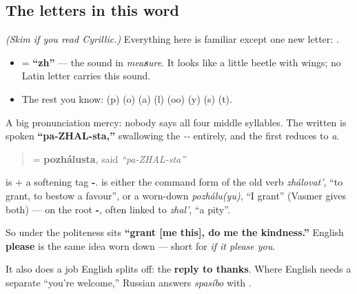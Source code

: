 \subsection*{The letters in this word}
\emph{(Skim if you read Cyrillic.)} Everything here is familiar except one new letter: \textbf{}.

\begin{itemize}
\raggedright
  \item \textbf{} = \textbf{\textquotedblleft{}zh\textquotedblright{}} — the sound in \emph{mea\textbf{s}ure}. It looks like a little beetle with wings; no Latin letter carries this sound.
  \item The rest you know: \textbf{}(p) \textbf{}(o) \textbf{}(a) \textbf{}(l) \textbf{}(oo) \textbf{}(y) \textbf{}(s) \textbf{}(t).
\end{itemize}

A big pronunciation mercy: nobody says all four middle syllables. The written \emph{} is spoken \textbf{\textquotedblleft{}pa-ZHAL-sta,\textquotedblright{}} swallowing the \emph{--} entirely, and the first \emph{} reduces to \emph{a}.

\begin{quote}
\textbf{} = \textbf{pozhálusta}, said \emph{\textquotedblleft{}pa-ZHAL-sta\textquotedblright{}}
\end{quote}

\begin{cousinweb}
\textbf{} is \textbf{} + a softening tag \textbf{-}. \textbf{} is either the command form of the old verb \emph{zhálovat'}, \textquotedblleft{}to grant, to bestow a favour\textquotedblright{}, or a worn-down \emph{pozhálu(yu)}, \textquotedblleft{}I grant\textquotedblright{} (Vasmer gives both) — on the root \textbf{-}, often linked to \emph{zhal'}, \textquotedblleft{}a pity\textquotedblright{}.

So under the politeness sits \textbf{\textquotedblleft{}grant {[}me this{]}, do me the kindness.\textquotedblright{}} English \textbf{please} is the same idea worn down — short for \emph{if it please you}.

It also does a job English splits off: the \textbf{reply to thanks}. Where English needs a separate \textquotedblleft{}you're welcome,\textquotedblright{} Russian answers \emph{spasíbo} with \emph{}.
\end{cousinweb}

